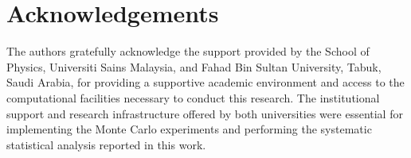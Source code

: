 \documentclass[a4paper,fleqn]{cas-sc}
\begin{document}
\section*{Acknowledgements}
The authors gratefully acknowledge the support provided by the School of Physics, Universiti Sains Malaysia, and Fahad Bin Sultan University, Tabuk, Saudi Arabia, for providing a supportive academic environment and access to the computational facilities necessary to conduct this research. The institutional support and research infrastructure offered by both universities were essential for implementing the Monte Carlo experiments and performing the systematic statistical analysis reported in this work.

\printcredits



\end{document}
